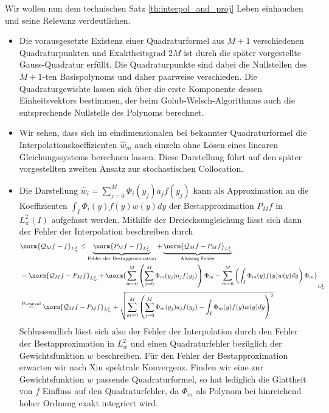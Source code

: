 \begin{mathbem}
Wir wollen nun dem technischen Satz \ref{th:interpol_and_proj} Leben einhauchen und seine Relevanz verdeutlichen.
\begin{itemize}
\item
Die vorausgesetzte Existenz einer Quadraturformel aus $M+1$ verschiedenen Quadraturpunkten und Exaktheitsgrad $2M$ ist durch die später vorgestellte Gauss-Quadratur erfüllt. Die Quadraturpunkte sind dabei die Nullstellen des $M+1$-ten Basispolynoms und daher paarweise verschieden. Die Quadraturgewichte lassen sich über die erste Komponente dessen Einheitsvektors bestimmen, der beim Golub-Welsch-Algorithmus auch die entsprechende Nullstelle des Polynoms berechnet.
\item
Wir sehen, dass sich im eindimensionalen bei bekannter Quadraturformel die Interpolationskoeffizienten $\hat{w}_m$ auch einzeln ohne Lösen eines linearen Gleichungssystems berechnen lassen. Diese Darstellung führt auf den später vorgestellten zweiten Ansatz zur stochastischen Collocation.
\item
Die Darstellung $\hat{w}_i=\sum_{j=0}^M\Phi_i(y_j)a_jf(y_j)$ kann als Approximation an die Koeffizienten $\int_I \Phi_i(y)f(y)w(y)dy$ der Bestapproximation $P_Mf$ in $L_w^2(I)$ aufgefasst werden. Mithilfe der Dreiecksungleichung lässt sich dann der Fehler der Interpolation beschreiben durch
\begin{align*}
&\norm{\mathcal{Q}_Mf-f}_{L_w^2}\le \underbrace{\norm{P_Mf-f}_{L_w^2}}_{\text{Fehler der Bestapproximation}}+\underbrace{\norm{\mathcal{Q}_Mf-P_Mf}_{L_w^2}}_{\text{Aliasing Fehler}}\\
&=\norm{\mathcal{Q}_Mf-P_Mf}_{L_w^2}+\norm{\sum_{m=0}^M\left(\sum_{j=0}^M\Phi_m(y_j)a_jf(y_j)\right)\Phi_m-\sum_{m=0}^M\left(\int_I\Phi_m(y)f(y)w(y)dy\right)\Phi_m}_{L_w^2}\\
&\stackrel{\text{Parseval}}{=}\norm{\mathcal{Q}_Mf-P_Mf}_{L_w^2}+\sqrt{\sum_{m=0}^M\left(\sum_{j=0}^M\Phi_m(y_j)a_jf(y_j)-\int_I\Phi_m(y)f(y)w(y)dy\right)^2}
\end{align*}
Schlussendlich lässt sich also der Fehler der Interpolation durch den Fehler der Bestapproximation in $L_w^2$ und einen Quadraturfehler bezüglich der Gewichtsfunktion $w$ beschreiben. Für den Fehler der Bestapproximation erwarten wir nach Xiu spektrale Konvergenz. Finden wir eine zur Gewichtsfunktion $w$ passende Quadraturformel, so hat lediglich die Glattheit von $f$ Einfluss auf den Quadraturfehler, da $\Phi_m$ als Polynom bei hinreichend hoher Ordnung exakt integriert wird.
\end{itemize}
\end{mathbem}
